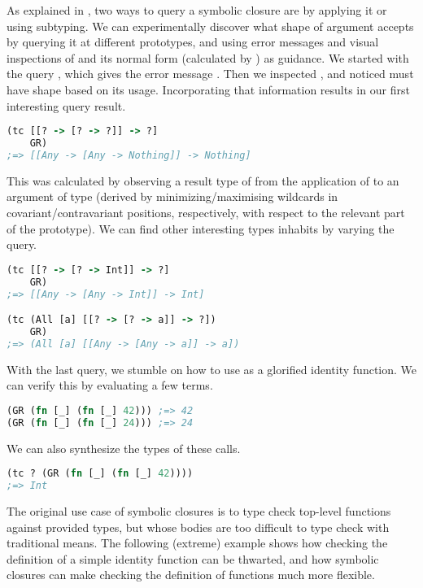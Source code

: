 As explained in , two ways
to query a symbolic closure are by applying it or using subtyping.
We can experimentally discover what shape of argument \GRterm accepts 
by querying it at different prototypes, and using error messages and
visual inspections of \GRterm and its normal form (calculated by \GRclosure) as guidance.
We started with the query , which
gives the error message .
Then we inspected \GRclosure, and noticed 
must have shape \clj{[? -> [? -> ?]]} based on its usage.
Incorporating that information results in our first interesting query result.

\begin{lstlisting}[language=Clojure]
(tc [[? -> [? -> ?]] -> ?]
    GR)
;=> [[Any -> [Any -> Nothing]] -> Nothing]
\end{lstlisting}

This was calculated by observing a result type of 
from the application of \GRclosure to an argument of type 
(derived by minimizing/maximising wildcards 
in covariant/contravariant positions, respectively, with respect to the relevant part of the prototype).
We can find other interesting types \GRclosure inhabits by varying the query.

\begin{lstlisting}[language=Clojure]
(tc [[? -> [? -> Int]] -> ?]
    GR)
;=> [[Any -> [Any -> Int]] -> Int]

(tc (All [a] [[? -> [? -> a]] -> ?])
    GR)
;=> (All [a] [[Any -> [Any -> a]] -> a])
\end{lstlisting}

With the last query, we stumble on how to use \GRterm as a glorified identity function.
We can verify this by evaluating a few terms.

\begin{lstlisting}[language=Clojure]
(GR (fn [_] (fn [_] 42))) ;=> 42
(GR (fn [_] (fn [_] 24))) ;=> 24
\end{lstlisting}

We can also synthesize the types of these calls.

\begin{lstlisting}[language=Clojure]
(tc ? (GR (fn [_] (fn [_] 42))))
;=> Int
\end{lstlisting}

The original use case of symbolic closures is to type check
top-level functions against provided types,
but whose bodies are too difficult to type check with traditional means.
The following (extreme) example shows how checking the definition
of a simple identity function can be thwarted, and how symbolic closures
can make checking the definition of functions much more flexible.

